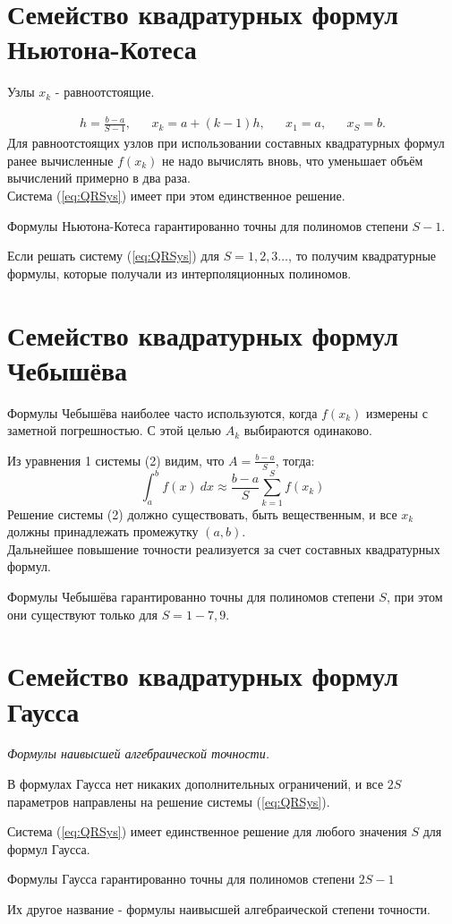 \documentclass[a4paper,11pt]{article}
\begin{document}
\section{Семейство квадратурных формул Ньютона-Котеса}
\begin{importantblock}
  Узлы $x_k$ - равноотстоящие.
\end{importantblock}
\begin{align*}
  h = \frac{b-a}{S-1}, && x_k=a+(k-1)h, && x_1=a, && x_S=b.
\end{align*}
Для равноотстоящих узлов при использовании составных квадратурных формул ранее вычисленные $f(x_k)$ не надо вычислять вновь, что
уменьшает объём вычислений примерно в два раза. \\
Система (\ref{eq:QRSys}) имеет при этом единственное решение.
\begin{importantblock}
  Формулы Ньютона-Котеса гарантированно точны для полиномов степени $S-1$.
\end{importantblock}
Если решать систему (\ref{eq:QRSys}) для $S = 1, 2, 3\dots$, то получим квадратурные формулы, которые получали из интерполяционных полиномов.

\section{Семейство квадратурных формул Чебышёва}
\begin{importantblock}
  Формулы Чебышёва наиболее часто используются, когда $f(x_k)$ измерены с заметной погрешностью. С этой целью $A_k$ выбираются одинаково.
\end{importantblock}
Из уравнения 1 системы (2) видим, что $A = \frac{b-a}{S}$, тогда:
\[\int_a^b f(x)\ dx \approx \frac{b-a}{S} \sum_{k=1}^S f(x_k)\]
Решение системы (2) должно существовать, быть вещественным, и все $x_k$ должны принадлежать промежутку $(a, b)$. \\
Дальнейшее повышение точности реализуется за счет составных квадратурных формул.
\begin{importantblock}
  Формулы Чебышёва гарантированно точны для полиномов степени $S$, при этом они существуют только для $S = 1-7, 9$.
\end{importantblock}

\section{Семейство квадратурных формул Гаусса}
\textit{Формулы наивысшей алгебраической точности.}
\begin{importantblock}
  В формулах Гаусса нет никаких дополнительных ограничений, и все $2S$ параметров направлены на решение системы (\ref{eq:QRSys}).
\end{importantblock}
Система (\ref{eq:QRSys}) имеет единственное решение для любого значения $S$ для формул Гаусса.
\begin{importantblock}
  Формулы Гаусса гарантированно точны для полиномов степени $2S-1$
\end{importantblock}
Их другое название - формулы наивысшей алгебраической степени точности. \\
\end{document}
